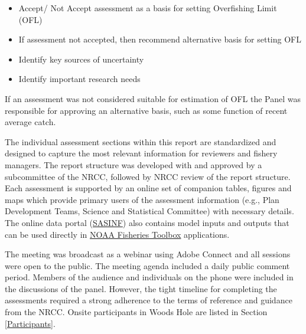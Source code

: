 \begin{itemize}
\item Accept/ Not Accept assessment as a basis for setting Overfishing Limit (OFL)
\item If assessment not accepted, then recommend alternative basis for setting OFL
\item Identify key sources of uncertainty
\item Identify important research needs
\end{itemize}

If an assessment was not considered suitable for estimation of OFL the Panel was responsible for approving an alternative basis, such as some function of recent average catch.  

The individual assessment sections within this report are standardized and designed to capture the most relevant information for reviewers and fishery managers. The report structure was developed with and approved by a subcommittee of the NRCC, followed by NRCC review of the report structure.  Each assessment is  supported by an online set of companion tables, figures and maps which provide primary users of the assessment information (e.g., Plan Development Teams, Science and Statistical Committee) with necessary  details.  The online data portal (\href{http://www.nefsc.noaa.gov/saw/sasi/sasi_report_options.php}{SASINF}{}) also contains model inputs and outputs that can be used directly in \href{http://nft.nefsc.noaa.gov/}{NOAA Fisheries Toolbox}{} applications.  

The meeting was broadcast as a webinar using Adobe Connect and all sessions were open to the public. The meeting agenda included a daily public comment period.   Members of the audience and individuals on the phone were included in the discussions of the panel.  However, the tight timeline for completing the assessments required a strong adherence to the terms of reference and guidance from the NRCC.  Onsite participants in Woods Hole are listed in Section \ref{Participants}.

